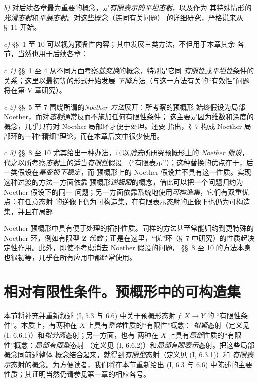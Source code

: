\medskip
\noindent
\emph{b)} 对后续各章最为重要的概念，是\emph{有限表示的平坦态射}，以及作为
其特殊情形的\emph{光滑态射}和\emph{平展态射}。对这些概念（连同有关问题）
的详细研究，严格说来从 §~11 开始。

\medskip
\noindent
\emph{c)} §§~1 至 10 可以视为预备性内容；其中发展三类方法，不但用于本章其余
各节，当然也用于后续各章：

\medskip
\noindent
\emph{c 1)} §§~1 至 4 从不同方面考察\emph{基变换}的概念，特别是它同
\emph{有限性}或\emph{平坦性}条件的关系；这里以最初等的形式开始发展
\emph{下降}方法（与这一方法有关的“有效性”问题将在第 V 章研究）。

\medskip
\noindent
\emph{c 2)} §§~5 至 7 围绕所谓的\emph{Noether 方法}展开：所考察的预概形
始终假设为局部 Noether，而对\emph{态射}通常反而不施加任何有限性条件；
这主要是因为维数和深度的概念，几乎只有对 Noether 局部环才便于处理。还要
指出，§~7 构成 Noether 局部环的一种“精细”理论，而在本章后文中很少使用。

\medskip
\noindent
\emph{c 3)} §§~8 至 10 尤其给出一种办法，可以\emph{消去}所研究预概形上的
\emph{Noether 假设}，代之以所考察\emph{态射}上的适当\emph{有限性}假设
（“有限表示”）；这种替换的优点在于，后一类假设在\emph{基变换下稳定}，而
预概形上的 Noether 假设并不具有这一性质。实现这种过渡的方法一方面依靠
预概形\emph{逆极限}的概念，借此可以把一个问题归约为 Noether 假设下的同一
问题；另一方面依靠系统地使用\emph{可构造集}，它们有双重优点：在任意态射
的逆像下仍为可构造集，在有限表示态射的正像下也仍为可构造集，并且在局部


Noether 预概形中具有便于处理的拓扑性质。同样的方法甚至常能归约到更特殊的
Noether 环，例如有限型 $\mathbf Z$-\emph{代数}；正是在这里，“优”环（§~7
中研究）的性质起决定性作用。此外，即使不考虑消去 Noether 假设的问题，
§§~8 至 10 的方法本身也很初等，几乎在所有应用中都经常使用。

\setcounter{section}{0}

\section{相对有限性条件。预概形中的可构造集}
\label{section:IV.1-fr}

本节将补充并重新叙述 (I, 6.3 与 6.6) 中关于预概形态射 $f:X\to Y$ 的
“有限性条件”。本质上，有两种在 $X$ 上具有\emph{整体}性质的“有限性”概念：
\emph{拟紧}态射（定义见 (I, 6.6.1)）和\emph{拟分离}态射；另一方面，也有
两种在 $X$ 上具有\emph{局部}性质的“有限性”概念：\emph{局部有限型}态射
（定义见 (I, 6.6.2)）和\emph{局部有限表示}态射。把这些局部概念同前述整体
概念结合起来，就得到\emph{有限型}态射（定义见 (I, 6.3.1)）和
\emph{有限表示}态射的概念。为方便读者，我们将在本节重新给出 (I, 6.3 与
6.6) 中陈述的主要性质；其证明当然仍请参见第一章的相应各号。

